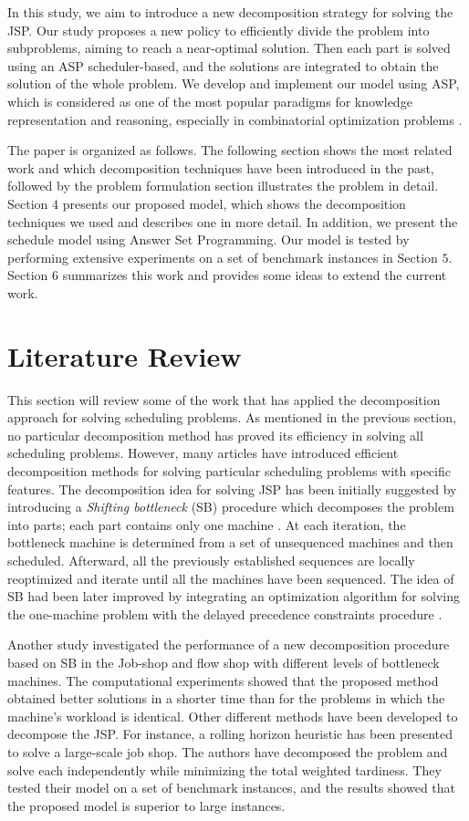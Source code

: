 \documentclass[runningheads]{llncs}
\begin{document}
In this study, we aim to introduce a new decomposition strategy for solving the JSP. Our study proposes a new policy to efficiently divide the problem into subproblems, aiming to reach a near-optimal solution. Then each part is solved using an ASP scheduler-based, and the solutions are integrated to obtain the solution of the whole problem. We develop and implement our model using ASP, which is considered as one of the most popular paradigms for knowledge representation and reasoning, especially in combinatorial optimization problems \cite{abseher2016shift}. 

The paper is organized as follows. The following section shows the most related work and which decomposition techniques have been introduced in the past, followed by the problem formulation section illustrates the problem in detail. Section $4$ presents our proposed model, which shows the decomposition techniques we used and describes one in more detail. In addition, we present the schedule model using Answer Set Programming. Our model is tested by performing extensive experiments on a set of benchmark instances in Section $5$. Section $6$ summarizes this work and provides some ideas to extend the current work.

\section{Literature Review}
This section will review some of the work that has applied the decomposition approach for solving scheduling problems. As mentioned in the previous section, no particular decomposition method has proved its efficiency in solving all scheduling problems. However, many articles have introduced efficient decomposition methods for solving particular scheduling problems with specific features. The decomposition idea for solving JSP has been initially suggested by introducing a \textit{Shifting bottleneck} (SB) procedure which decomposes the problem into parts; each part contains only one machine \cite{adams1988shifting}. At each iteration, the bottleneck machine is determined from a set of unsequenced machines and then scheduled. Afterward, all the previously established sequences are locally reoptimized and iterate until all the machines have been sequenced. The idea of SB had been later improved by integrating an optimization algorithm for solving the one-machine problem with the delayed precedence constraints procedure \cite{balas1995one}.

Another study investigated the performance of a new decomposition procedure based on SB in the Job-shop and flow shop with different levels of bottleneck machines. The computational experiments showed that the proposed method obtained better solutions in a shorter time than for the problems in which the machine's workload is identical. Other different methods have been developed to decompose the JSP. For instance, a rolling horizon heuristic has been presented \cite{singer2001decomposition} to solve a large-scale job shop. The authors have decomposed the problem and solve each independently while minimizing the total weighted tardiness. They tested their model on a set of benchmark instances, and the results showed that the proposed model is superior to large instances. 
\end{document}
